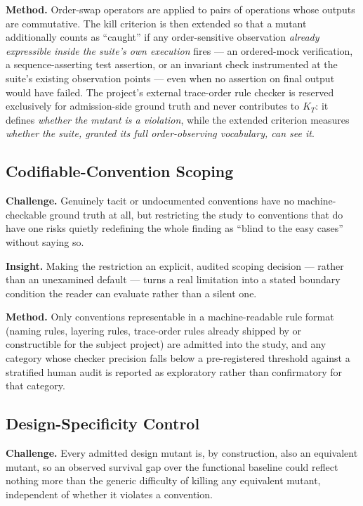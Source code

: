 \documentclass[11pt]{article}
\begin{document}
\textbf{Method.} Order-swap operators are applied to pairs of operations whose outputs are commutative. The kill criterion is then extended so that a mutant additionally counts as ``caught'' if any order-sensitive observation \emph{already expressible inside the suite's own execution} fires --- an ordered-mock verification, a sequence-asserting test assertion, or an invariant check instrumented at the suite's existing observation points --- even when no assertion on final output would have failed. The project's external trace-order rule checker is reserved exclusively for admission-side ground truth and never contributes to $K_T$: it defines \emph{whether the mutant is a violation}, while the extended criterion measures \emph{whether the suite, granted its full order-observing vocabulary, can see it}.

\subsection{Codifiable-Convention Scoping}
\textbf{Challenge.} Genuinely tacit or undocumented conventions have no machine-checkable ground truth at all, but restricting the study to conventions that do have one risks quietly redefining the whole finding as ``blind to the easy cases'' without saying so.

\textbf{Insight.} Making the restriction an explicit, audited scoping decision --- rather than an unexamined default --- turns a real limitation into a stated boundary condition the reader can evaluate rather than a silent one.

\textbf{Method.} Only conventions representable in a machine-readable rule format (naming rules, layering rules, trace-order rules already shipped by or constructible for the subject project) are admitted into the study, and any category whose checker precision falls below a pre-registered threshold against a stratified human audit is reported as exploratory rather than confirmatory for that category.

\subsection{Design-Specificity Control}
\textbf{Challenge.} Every admitted design mutant is, by construction, also an equivalent mutant, so an observed survival gap over the functional baseline could reflect nothing more than the generic difficulty of killing any equivalent mutant, independent of whether it violates a convention.
\end{document}
